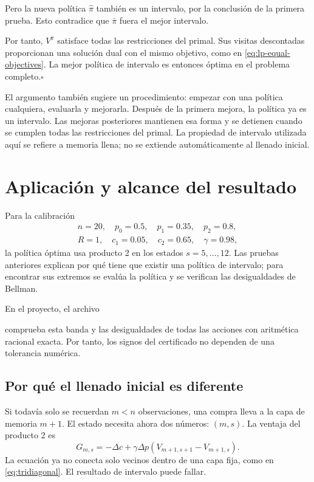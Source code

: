 \documentclass[11pt,a4paper]{article}
\begin{document}
Pero la nueva política $\widehat\pi$ también es un intervalo, por la
conclusión de la primera prueba. Esto contradice que $\bar\pi$ fuera
el mejor intervalo.

Por tanto, $V^{\bar\pi}$ satisface todas las restricciones del primal.
Sus visitas descontadas proporcionan una solución dual con el mismo
objetivo, como en \eqref{eq:lp-equal-objectives}. La mejor política de
intervalo es entonces óptima en el problema completo.\hfill$\square$

El argumento también sugiere un procedimiento: empezar con una
política cualquiera, evaluarla y mejorarla. Después de la primera
mejora, la política ya es un intervalo. Las mejoras posteriores
mantienen esa forma y se detienen cuando se cumplen todas las
restricciones del primal. La propiedad de intervalo utilizada aquí
se refiere a memoria llena; no se extiende automáticamente al llenado
inicial.


\clearpage
\section{Aplicación y alcance del resultado}

Para la calibración
\[
\begin{gathered}
n=20,\quad p_0=0.5,\quad p_1=0.35,\quad p_2=0.8,\\
R=1,\quad c_1=0.05,\quad c_2=0.65,\quad\gamma=0.98,
\end{gathered}
\]
la política óptima usa producto 2 en los estados $s=5,\ldots,12$.
Las pruebas anteriores explican por qué tiene que existir una política
de intervalo; para encontrar sus extremos se evalúa la política y se
verifican las desigualdades de Bellman.

En el proyecto, el archivo
\begin{center}
\end{center}
comprueba esta banda y las desigualdades de todas las acciones con
aritmética racional exacta. Por tanto, los signos del certificado no
dependen de una tolerancia numérica.

\subsection{Por qué el llenado inicial es diferente}

Si todavía solo se recuerdan $m<n$ observaciones, una compra lleva
a la capa de memoria $m+1$. El estado necesita ahora dos números:
$(m,s)$. La ventaja del producto 2 es
\[
G_{m,s}=-\Delta c+\gamma\Delta p
          \left(V_{m+1,s+1}-V_{m+1,s}\right).
\]
La ecuación ya no conecta solo vecinos dentro de una capa fija, como
en \eqref{eq:tridiagonal}. El resultado de intervalo puede fallar.
\end{document}
